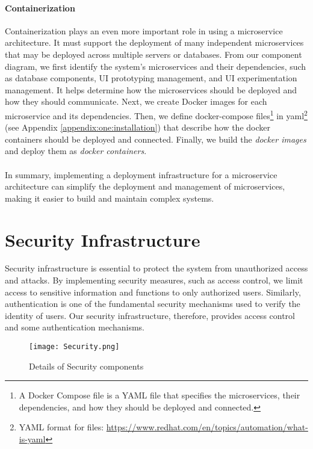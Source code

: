 \paragraph{Containerization}
Containerization plays an even more important role in using a microservice architecture. 
It must support the deployment of many independent microservices that may be deployed across multiple servers or databases.
From our component diagram, we first identify the system's microservices and their dependencies, such as database components, UI prototyping management, and UI experimentation management. 
It helps determine how the microservices should be deployed and how they should communicate.
Next, we create Docker images for each microservice and its dependencies.
Then, we define docker-compose files\footnote{A Docker Compose file is a YAML file that specifies the microservices, their dependencies, and how they should be deployed and connected.} in yaml\footnote{YAML format for files: \url{https://www.redhat.com/en/topics/automation/what-is-yaml}} (see Appendix \ref{appendix:one:installation}) that describe how the docker containers should be deployed and connected.
Finally, we build the \textit{docker images} and deploy them as \textit{docker containers}. \\\\
In summary, implementing a deployment infrastructure for a microservice architecture can simplify the deployment and management of microservices, making it easier to build and maintain complex systems.

\clearpage
\section{Security Infrastructure}
\label{sc:section:security}
Security infrastructure is essential to protect the system from unauthorized access and attacks. 
By implementing security measures, such as access control, we limit access to sensitive information and functions to only authorized users.
Similarly, authentication is one of the fundamental security mechanisms used to verify the identity of users.
Our security infrastructure, therefore, provides access control and some authentication mechanisms.

\begin{figure}[htbp!]
    \centering    
    \texttt{[image: Security.png]} 
    \caption[Details of Security components]{Details of Security components}
    \label{fig:sc:security}
\end{figure}

